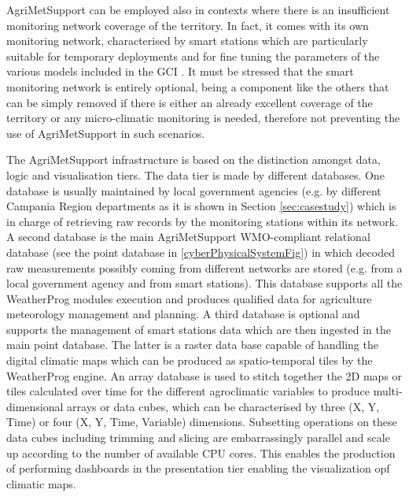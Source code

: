 \documentclass[authoryear,preprint,review,12pt]{elsarticle}
\newcommand{\note}[1]{\emph{\textcolor{red}{#1}}}
\begin{document}

AgriMetSupport can be employed also in contexts where there is an insufficient monitoring network coverage of the territory.
In fact, it comes with its own monitoring network, characterised by smart stations which are particularly suitable for temporary deployments and for fine tuning the parameters of the various models included in the GCI \citep{Martino2019AFI}.
It must be stressed that the smart monitoring network is entirely optional, being a component like the others that can be simply removed if there is either an already excellent coverage of the territory or any micro-climatic monitoring is needed, therefore not preventing the use of AgriMetSupport in such scenarios. %

The AgriMetSupport infrastructure is based on the distinction amongst data, logic and visualisation tiers.
The data tier is made by different databases.
One database is usually maintained by local government agencies (e.g. by different Campania Region departments as it is shown in Section \ref{sec:casestudy}) which is in charge of retrieving raw records by the monitoring stations within its network.
A second database is the main AgriMetSupport WMO-compliant relational database (see the point database in \cref{cyberPhysicalSystemFig}) in which decoded raw measurements possibly coming from different networks are stored (e.g. from a local government agency and from smart stations).
This database supports all the WeatherProg modules execution and produces qualified data for agriculture meteorology management and planning.
A third database is optional and supports the management of smart stations data which are then ingested in the main point database.
The latter is a raster data base capable of handling the digital climatic maps which can be produced as spatio-temporal tiles by the WeatherProg engine.
An array database is used to stitch together the 2D maps or tiles calculated over time for the different agroclimatic variables to produce multi-dimensional arrays or data cubes, which can be  characterised by three (X, Y, Time) or four (X, Y, Time, Variable) dimensions.
Subsetting operations on these data cubes including trimming and slicing are embarrassingly parallel and scale up according to the number of available CPU cores.
This enables the production of performing dashboards in the presentation tier enabling the visualization opf climatic maps.
\end{document}
